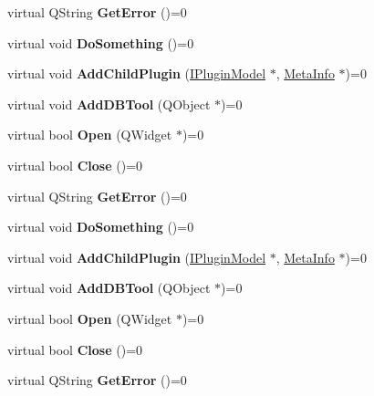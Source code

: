 \begin{DoxyCompactItemize}
\item 
\mbox{\label{class_i_plugin_model_ad42778c15ce3e8fdb9524a6dfd61792a}} 
virtual Q\+String {\bfseries Get\+Error} ()=0
\item 
\mbox{\label{class_i_plugin_model_a377627e683f892ffda2c6225d975251b}} 
virtual void {\bfseries Do\+Something} ()=0
\item 
\mbox{\label{class_i_plugin_model_aff406b0571f6dc77488c315e0df0f563}} 
virtual void {\bfseries Add\+Child\+Plugin} (\hyperlink{class_i_plugin_model}{I\+Plugin\+Model} $\ast$, \hyperlink{struct_meta_info}{Meta\+Info} $\ast$)=0
\item 
\mbox{\label{class_i_plugin_model_a2db1262756c4a587fd6cd2d7191841fb}} 
virtual void {\bfseries Add\+D\+B\+Tool} (Q\+Object $\ast$)=0
\item 
\mbox{\label{class_i_plugin_model_ac1c51202f69db707ca56e8f3c78ce163}} 
virtual bool {\bfseries Open} (Q\+Widget $\ast$)=0
\item 
\mbox{\label{class_i_plugin_model_a3f9ce2298f73283fec68fc908db14e57}} 
virtual bool {\bfseries Close} ()=0
\item 
\mbox{\label{class_i_plugin_model_ad42778c15ce3e8fdb9524a6dfd61792a}} 
virtual Q\+String {\bfseries Get\+Error} ()=0
\item 
\mbox{\label{class_i_plugin_model_a377627e683f892ffda2c6225d975251b}} 
virtual void {\bfseries Do\+Something} ()=0
\item 
\mbox{\label{class_i_plugin_model_aff406b0571f6dc77488c315e0df0f563}} 
virtual void {\bfseries Add\+Child\+Plugin} (\hyperlink{class_i_plugin_model}{I\+Plugin\+Model} $\ast$, \hyperlink{struct_meta_info}{Meta\+Info} $\ast$)=0
\item 
\mbox{\label{class_i_plugin_model_a2db1262756c4a587fd6cd2d7191841fb}} 
virtual void {\bfseries Add\+D\+B\+Tool} (Q\+Object $\ast$)=0
\item 
\mbox{\label{class_i_plugin_model_ac1c51202f69db707ca56e8f3c78ce163}} 
virtual bool {\bfseries Open} (Q\+Widget $\ast$)=0
\item 
\mbox{\label{class_i_plugin_model_a3f9ce2298f73283fec68fc908db14e57}} 
virtual bool {\bfseries Close} ()=0
\item 
\mbox{\label{class_i_plugin_model_ad42778c15ce3e8fdb9524a6dfd61792a}} 
virtual Q\+String {\bfseries Get\+Error} ()=0
\end{DoxyCompactItemize}


